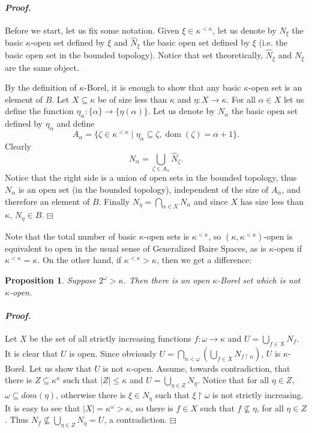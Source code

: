\documentclass[12pt,a4paper]{amsart}
\newtheorem{prop}[thm]{Proposition}
\theoremstyle{definition}
\theoremstyle{remark}
\DeclareMathOperator{\dom}{dom}
\renewcommand{\mid}{\mathrel{|}\allowbreak}
\renewcommand{\restriction}{\mathbin\upharpoonright}
\newenvironment{cproof}{\paragraph{\emph{Proof.\,}}}{\hfill{$\boxminus$}\par\vspace{2mm}}
\begin{document}
\begin{cproof}
    Before we start, let us fix some notation. Given $\xi\in \kappa^{<\kappa}$, let us denote by $N_\xi$ the basic $\kappa$-open set defined by $\xi$ and $\hat N_\xi$ the basic open set defined by $\xi$ (i.e. the basic open set in the bounded topology). Notice that set theoretically, $\hat N_\xi$ and $N_\xi$ are the same object.

    By the definition of $\kappa$-Borel, it is enough to show that any basic $\kappa$-open set is an element of $B$. Let $X\subseteq \kappa$ be of size less than $\kappa$ and $\eta:X\rightarrow\kappa$. 
    For all $\alpha\in X$ let us define the function $\eta_\alpha:\{\alpha\}\rightarrow\{\eta(\alpha)\}$. Let us denote by $N_\alpha$ the basic open set defined by $\eta_\alpha$ and define $$A_\alpha=\{\zeta\in \kappa^{<\kappa}\mid \eta_\alpha\subseteq \zeta, \dom (\zeta)=\alpha+1\}.$$
    Clearly $$N_\alpha=\bigcup_{\zeta\in A_\alpha}\hat N_\zeta.$$    
    Notice that the right side is a union of open sets in the bounded topology, thus $N_\alpha$ is an open set (in the bounded topology), independent of the size of $A_\alpha$, and therefore an element of $B$.
    Finally $N_\eta=\bigcap_{\alpha\in X}N_\alpha$ and since $X$ has size less than $\kappa$, $N_\eta\in B$.
\end{cproof}

Note that the total number of basic $\kappa$-open sets is $\kappa^{<\kappa}$, so  $(\kappa,\kappa^{<\kappa})$-open  is equivalent to open  in the usual sense of  Generalized Baire Spaces, as is $\kappa$-open if 
$\kappa^{<\kappa}=\kappa$. On the other hand, if $\kappa^{<\kappa}>\kappa$, then we get a difference:

\begin{prop}
    Suppose $2^\omega>\kappa$. Then there is an open $\kappa$-Borel set which is  not $\kappa$-open.  
\end{prop}

\begin{cproof}
    Let $X$ be the set of all strictly increasing functions $f:\omega\rightarrow\kappa$ and $U=\bigcup_{f\in X}N_f$. It is clear that $U$ is open. Since obviously $U=\bigcap_{n<\omega}(\bigcup_{f\in X}N_{f\restriction n})$, $U$ is $\kappa$-Borel. Let us show that $U$ is not $\kappa$-open. Assume, towards contradiction, that there is $Z\subseteq \kappa^\kappa$ such that $|Z|\leq \kappa$ and $U=\bigcup_{\eta\in Z}N_\eta$. Notice that for all $\eta\in Z$, $\omega\subseteq dom(\eta)$, otherwise there is $\xi\in N_\eta$ such that $\xi\restriction \omega$ is not strictly increasing. It is easy to see that $|X|=\kappa^\omega>\kappa$, so there is $f\in X$ such that $f\not \subseteq \eta$, for all $\eta\in Z$. Thus $N_f\not\subseteq \bigcup_{\eta\in Z}N_\eta=U$, a contradiction.
\end{cproof}
\end{document}
